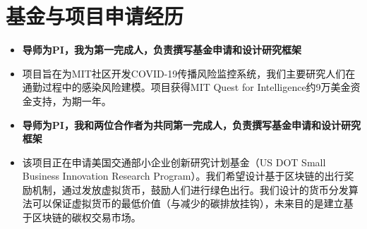 
\section{基金与项目申请经历}
\begin{itemize}[parsep=0.5ex]
  \item \textbf{导师为PI，我为第一完成人，负责撰写基金申请和设计研究框架}
  \item 项目旨在为MIT社区开发COVID-19传播风险监控系统，我们主要研究人们在通勤过程中的感染风险建模。项目获得MIT Quest for Intelligence约9万美金资金支持，为期一年。
\end{itemize}
\begin{itemize}[parsep=0.5ex]
  \item \textbf{导师为PI，我和两位合作者为共同第一完成人，负责撰写基金申请和设计研究框架}
  \item 该项目正在申请美国交通部小企业创新研究计划基金（US DOT Small Business Innovation Research Program）。我们希望设计基于区块链的出行奖励机制，通过发放虚拟货币，鼓励人们进行绿色出行。我们设计的货币分发算法可以保证虚拟货币的最低价值（与减少的碳排放挂钩），未来目的是建立基于区块链的碳权交易市场。
\end{itemize}
%
%